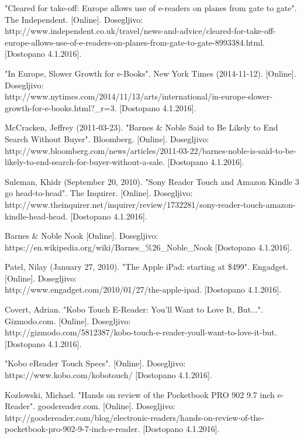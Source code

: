 \documentclass[a4paper, 12pt]{book}
\begin{document}
\begin{thebibliography}{99}
 "Cleared for take-off: Europe allows use of e-readers on planes from gate to gate". The Independent. 
[Online]. Dosegljivo:\\ http://www.independent.co.uk/travel/news-and-advice/cleared-for-take-off-europe-allows-use-of-e-readers-on-planes-from-gate-to-gate-8993384.html.
[Dostopano 4.1.2016].


 "In Europe, Slower Growth for e-Books". New York Times (2014-11-12).
[Online]. Dosegljivo:\\ http://www.nytimes.com/2014/11/13/arts/international/in-europe-slower-growth-for-e-books.html?\_r=3.
[Dostopano 4.1.2016].


 McCracken, Jeffrey (2011-03-23). "Barnes \& Noble Said to Be Likely to End Search Without Buyer". Bloomberg.
[Online]. Dosegljivo:\\ http://www.bloomberg.com/news/articles/2011-03-22/barnes-noble-is-said-to-be-likely-to-end-search-for-buyer-without-a-sale.
[Dostopano 4.1.2016].


 Suleman, Khidr (September 20, 2010). "Sony Reader Touch and Amazon Kindle 3 go head-to-head". The Inquirer.
[Online]. Dosegljivo:\\ http://www.theinquirer.net/inquirer/review/1732281/sony-reader-touch-amazon-kindle-head-head.
[Dostopano 4.1.2016].


 Barnes \& Noble Nook
[Online]. Dosegljivo:\\ https://en.wikipedia.org/wiki/Barnes\_\%26\_Noble\_Nook
[Dostopano 4.1.2016].

 Patel, Nilay (January 27, 2010). "The Apple iPad: starting at \$499". Engadget.
[Online]. Dosegljivo:\\ http://www.engadget.com/2010/01/27/the-apple-ipad.
[Dostopano 4.1.2016].

 Covert, Adrian. "Kobo Touch E-Reader: You'll Want to Love It, But...". Gizmodo.com. 
[Online]. Dosegljivo:\\ http://gizmodo.com/5812387/kobo-touch-e-reader-youll-want-to-love-it-but.
[Dostopano 4.1.2016].

 "Kobo eReader Touch Specs".
[Online]. Dosegljivo:\\ https://www.kobo.com/kobotouch/
[Dostopano 4.1.2016].

 Kozlowski, Michael. "Hands on review of the Pocketbook PRO 902 9.7 inch e-Reader". goodereader.com. 
[Online]. Dosegljivo:\\ http://goodereader.com/blog/electronic-readers/hands-on-review-of-the-pocketbook-pro-902-9-7-inch-e-reader.
[Dostopano 4.1.2016].


\end{thebibliography}
\end{document}
